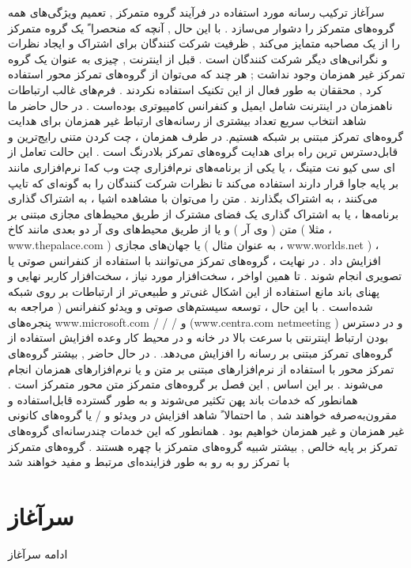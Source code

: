 \documentclass{beamer}
\begin{document}
\begin{persian}
\begin{frame}{سرآغاز}
ترکیب رسانه مورد استفاده در فرآیند گروه متمرکز , تعمیم ویژگی‌های همه گروه‌های متمرکز را دشوار می‌سازد . با این حال , آنچه که منحصرا ً یک گروه متمرکز را از یک مصاحبه متمایز می‌کند , ظرفیت شرکت کنندگان برای اشتراک و ایجاد نظرات و نگرانی‌های دیگر شرکت کنندگان است . قبل از اینترنت , چیزی به عنوان یک گروه تمرکز غیر همزمان وجود نداشت ; هر چند که می‌توان از گروه‌های تمرکز محور استفاده کرد , محققان به طور فعال از این تکنیک استفاده نکردند . فرم‌های غالب ارتباطات ناهمزمان در اینترنت شامل ایمیل و کنفرانس کامپیوتری بوده‌است . در حال حاضر ما شاهد انتخاب سریع تعداد بیشتری از رسانه‌های ارتباط غیر همزمان برای هدایت گروه‌های تمرکز مبتنی بر شبکه هستیم. در طرف همزمان ، چت کردن متنی رایج‌ترین و قابل‌دسترس ترین راه برای هدایت گروه‌های تمرکز بلادرنگ است . این حالت تعامل از نرم‌افزاری مانند Iای سی کیو نت متینگ ، یا یکی از برنامه‌های نرم‌افزاری چت وب که بر پایه جاوا قرار دارند استفاده می‌کند تا نظرات شرکت کنندگان را به گونه‌ای که تایپ می‌کنند ، به اشتراک بگذارند . متن را می‌توان با مشاهده اشیا ، به اشتراک گذاری برنامه‌ها ، یا به اشتراک گذاری یک فضای مشترک از طریق محیط‌های مجازی مبتنی بر متن ( وی آر ) و یا از طریق محیط‌های وی آر دو بعدی مانند کاخ ( مثلا ، www.thepalace.com ) یا جهان‌های مجازی ( به عنوان مثال ، www.worlds.net ) ، افزایش داد . در نهایت ، گروه‌های تمرکز می‌توانند با استفاده از کنفرانس صوتی یا تصویری انجام شوند . تا همین اواخر ، سخت‌افزار مورد نیاز ، سخت‌افزار کاربر نهایی و پهنای باند مانع استفاده از این اشکال غنی‌تر و طبیعی‌تر از ارتباطات بر روی شبکه شده‌است . با این حال ، توسعه سیستم‌های صوتی و ویدئو کنفرانس ( مراجعه به پنجره‌های www.microsoft.com / / / و (www.centra.com netmeeting ) و در دسترس بودن ارتباط اینترنتی با سرعت بالا در خانه و در محیط کار وعده افزایش استفاده از گروه‌های تمرکز مبتنی بر رسانه را افزایش می‌دهد. . 
در حال حاضر , بیشتر گروه‌های تمرکز محور با استفاده از نرم‌افزارهای مبتنی بر متن و یا نرم‌افزارهای همزمان انجام می‌شوند . بر این اساس , این فصل بر گروه‌های متمرکز متن محور متمرکز است . همانطور که خدمات باند پهن تکثیر می‌شوند و به طور گسترده قابل‌استفاده و مقرون‌به‌صرفه خواهند شد , ما احتمالا ً شاهد افزایش در ویدئو و / یا گروه‌های کانونی غیر همزمان و غیر همزمان خواهیم بود . همانطور که این خدمات چندرسانه‌ای گروه‌های تمرکز بر پایه خالص , بیشتر شبیه گروه‌های متمرکز با چهره هستند . گروه‌های متمرکز با تمرکز رو به رو به طور فزاینده‌ای مرتبط و مفید خواهند شد 

\end{frame}

\section{سرآغاز}
\begin{frame}{ادامه سرآغاز}


\end{frame}
\end{persian}
\end{document}
